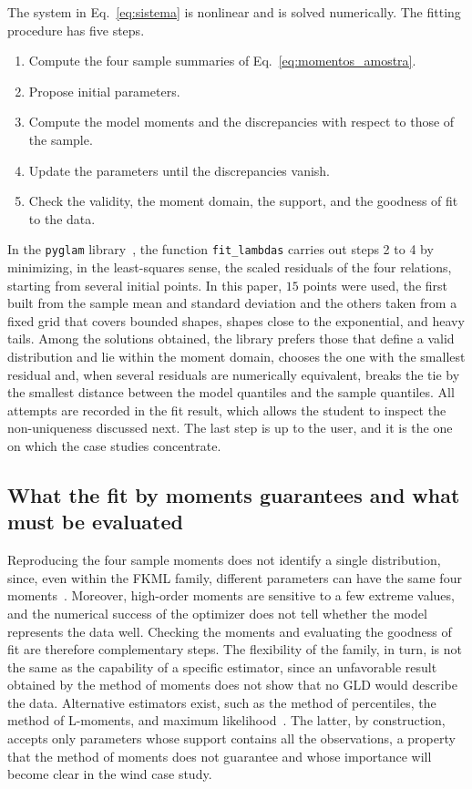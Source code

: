 The system in Eq.~\eqref{eq:sistema} is nonlinear and is solved numerically. The fitting procedure has five steps.
\begin{enumerate}
    \item Compute the four sample summaries of Eq.~\eqref{eq:momentos_amostra}.
    \item Propose initial parameters.
    \item Compute the model moments and the discrepancies with respect to those of the sample.
    \item Update the parameters until the discrepancies vanish.
    \item Check the validity, the moment domain, the support, and the goodness of fit to the data.
\end{enumerate}
In the \texttt{pyglam} library~\cite{pyglam}, the function \texttt{fit\_lambdas} carries out steps 2 to 4 by minimizing, in the least-squares sense, the scaled residuals of the four relations, starting from several initial points. In this paper, $15$ points were used, the first built from the sample mean and standard deviation and the others taken from a fixed grid that covers bounded shapes, shapes close to the exponential, and heavy tails. Among the solutions obtained, the library prefers those that define a valid distribution and lie within the moment domain, chooses the one with the smallest residual and, when several residuals are numerically equivalent, breaks the tie by the smallest distance between the model quantiles and the sample quantiles. All attempts are recorded in the fit result, which allows the student to inspect the non-uniqueness discussed next. The last step is up to the user, and it is the one on which the case studies concentrate.

\subsection{What the fit by moments guarantees and what must be evaluated}

Reproducing the four sample moments does not identify a single distribution, since, even within the FKML family, different parameters can have the same four moments~\cite{karian2011}. Moreover, high-order moments are sensitive to a few extreme values, and the numerical success of the optimizer does not tell whether the model represents the data well. Checking the moments and evaluating the goodness of fit are therefore complementary steps. The flexibility of the family, in turn, is not the same as the capability of a specific estimator, since an unfavorable result obtained by the method of moments does not show that no GLD would describe the data. Alternative estimators exist, such as the method of percentiles, the method of L-moments, and maximum likelihood~\cite{karian2011,su2007}. The latter, by construction, accepts only parameters whose support contains all the observations, a property that the method of moments does not guarantee and whose importance will become clear in the wind case study.

